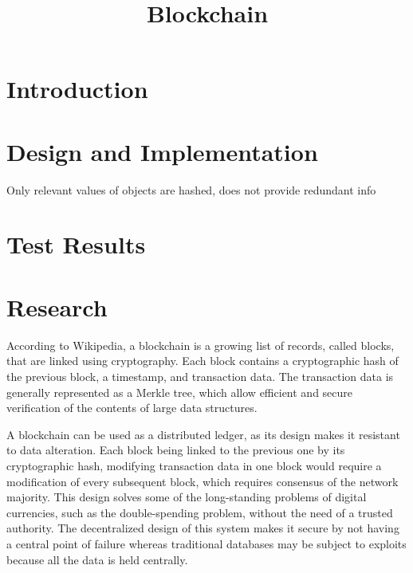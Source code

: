 \documentclass{article}
\title{\textbf{Blockchain}}
\author{}
\date{}
\begin{document}
\maketitle \thispagestyle{fancy}

\begin{abstract}
    
\end{abstract}

\section{Introduction}
 
\section{Design and Implementation}
Only relevant values of objects are hashed, does not provide redundant info

\section{Test Results}

\section{Research}

According to Wikipedia\cite{wiki:blockchain}, a blockchain is a growing list of records, called blocks, that are linked using cryptography. Each block contains a cryptographic hash of the previous block, a timestamp, and transaction data. The transaction data is generally represented as a Merkle tree, which allow efficient and secure verification of the contents of large data structures.

\bigskip

A blockchain can be used as a distributed ledger, as its design makes it resistant to data alteration. Each block being linked to the previous one by its cryptographic hash, modifying transaction data in one block would require a modification of every subsequent block, which requires consensus of the network majority. This design solves some of the long-standing problems of digital currencies, such as the double-spending problem, without the need of a trusted authority. The decentralized design of this system makes it secure by not having a central point of failure whereas traditional databases may be subject to exploits because all the data is held centrally.
\end{document}
